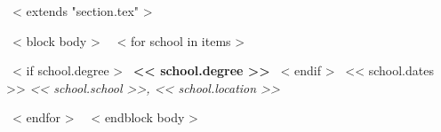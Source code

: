 ~< extends "section.tex" >~

~< block body >~
~< for school in items >~

  ~< if school.degree >~
    \textbf{<< school.degree >>}
  ~< endif >~
  \hfill
  << school.dates >> \newline
  \small{\emph{<< school.school >>, << school.location >>}}

~< endfor >~
~< endblock body >~
